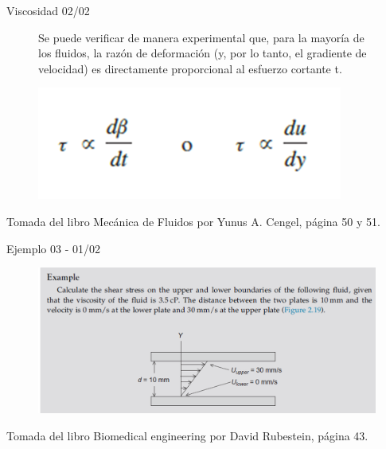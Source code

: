 \begin{frame}{Viscosidad 02/02}
\justifying
\begin{figure}
\centering
{}
\caption{Se puede verificar de manera experimental que, para la mayoría de los fluidos, la razón de deformación (y, por lo tanto, el gradiente de velocidad) es directamente proporcional al esfuerzo cortante t.}
\label{f:viscosidad}
\end{figure}
\begin{figure}[H]
\centering
\includegraphics[scale=0.6]{Section_Files/picmanuel/24.png}
\label{fig: Figura2-22}
\end{figure}
{\tiny Tomada del libro Mecánica de Fluidos por Yunus A. Cengel, página 50 y 51.}
\end{frame}

\begin{frame}{Ejemplo 03 - 01/02}
\justifying
\begin{figure}[H]
\centering
\includegraphics[scale=0.3]{Section_Files/picmanuel/25.png}
\label{fig: Figura2-23}
\end{figure}
{\tiny Tomada del libro Biomedical engineering por David Rubestein, página 43.}
\end{frame}

